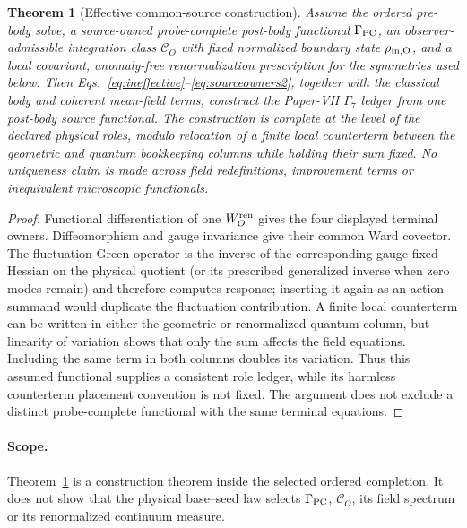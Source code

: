 \documentclass[11pt]{article}
\newtheorem{theorem}{Theorem}
\begin{document}
\begin{theorem}[Effective common-source construction]
\label{thm:effectivesource}
Assume the ordered pre-body solve, a source-owned probe-complete post-body
functional $\Gamma_{\rm PC}$, an observer-admissible integration class
$\mathcal C_O$ with fixed normalized boundary state
$\rho_{\rm in,O}$, and a local covariant, anomaly-free renormalization
prescription for the symmetries used below.  Then
Eqs.~\eqref{eq:ineffective}--\eqref{eq:sourceowners2}, together with the
classical body and coherent mean-field terms, construct the Paper-VII
$\Gamma_7$ ledger from one post-body source functional.  The construction is
complete at the level of the declared physical roles, modulo relocation of a
finite local counterterm between the geometric and quantum bookkeeping
columns while holding their sum fixed.  No uniqueness claim is made across
field redefinitions, improvement terms or inequivalent microscopic
functionals.
\end{theorem}
\begin{proof}
Functional differentiation of one $W_O^{\rm ren}$ gives the four displayed
terminal owners.  Diffeomorphism and gauge invariance give their common Ward
covector.  The fluctuation Green operator is the inverse of the corresponding
gauge-fixed Hessian on the physical quotient (or its prescribed generalized
inverse when zero modes remain) and therefore computes response; inserting it again as an
action summand would duplicate the fluctuation contribution.  A finite local
counterterm can be written in either the geometric or renormalized quantum
column, but linearity of variation shows that only the sum affects the field
equations.  Including the same term in both columns doubles its variation.
Thus this assumed functional supplies a consistent role ledger, while its
harmless counterterm placement convention is not fixed.  The argument does
not exclude a distinct probe-complete functional with the same terminal
equations.
\end{proof}

\paragraph{Scope.}
Theorem~\ref{thm:effectivesource} is a construction theorem inside the
selected ordered completion.  It does not show that the physical base--seed
law selects $\Gamma_{\rm PC}$, $\mathcal C_O$, its field spectrum or its
renormalized continuum measure.
\end{document}
